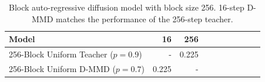 \begin{table}[t]
    \centering
    \begin{tabular}{l|rrrrrrrrr}
        \toprule
         \bfseries Model & 16 & 256 \\\midrule
        256-Block Uniform Teacher ($p=0.9$) & - & 0.225  \\
        256-Block Uniform D-MMD ($p=0.7$) & 0.225 & - \\
        \bottomrule
    \end{tabular}
    \caption{Block auto-regressive diffusion model with block size 256. 16-step D-MMD matches the performance of the 256-step teacher.}
    \label{tab:text_mmd_block_ar}
\end{table}
